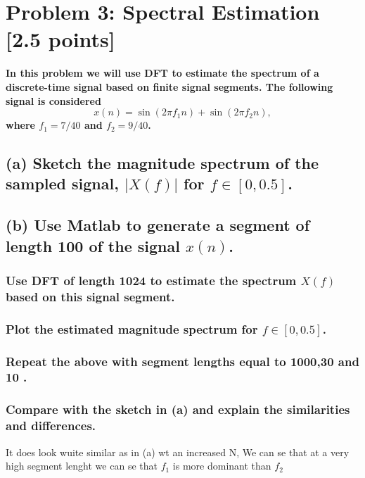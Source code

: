 \section{Problem 3: Spectral Estimation [2.5 points]}
\textbf{In this problem we will use DFT to estimate the spectrum of a discrete-time signal based on finite signal segments. The following signal is considered}
$$
x(n)=\sin \left(2 \pi f_1 n\right)+\sin \left(2 \pi f_2 n\right),
$$
\textbf{where $f_1=7 / 40$ and $f_2=9 / 40$.}
\subsection*{(a) Sketch the magnitude spectrum of the sampled signal, $|X(f)|$ for $f \in[0,0.5]$.}


\subsection*{(b) Use Matlab to generate a segment of length 100 of the signal $x(n)$.}


\subsubsection*{Use DFT of length 1024 to estimate the spectrum $X(f)$ based on this signal segment.}


\subsubsection*{Plot the estimated magnitude spectrum for $f \in[0,0.5]$.}


\subsubsection*{Repeat the above with segment lengths equal to 1000,30 and 10 .}


\subsubsection*{Compare with the sketch in (a) and explain the similarities and differences.}
It does look wuite similar as in (a) wt an increased N, We can se that at a very high segment lenght we can se that $f_1$ is more dominant than $f_2$

